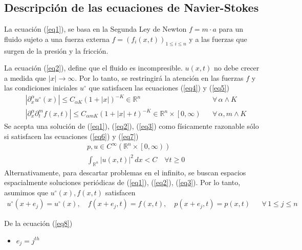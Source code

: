 \subsection{Descripción de las ecuaciones de Navier-Stokes}
La ecuación (\ref{eq1}), se basa en la Segunda Ley de Newton $f=m\cdot a$ para un fluido sujeto a una fuerza externa $f= \left(f_i(x,t)\right)_{1\leq i\leq n}$ y a las fuerzas que surgen de la presión y la fricción.

La ecuación (\ref{eq2}), define que el fluido es incompresible.  $u(x, t)$ no debe crecer a medida que $\left\lvert x\right\rvert \to \infty$. Por lo tanto, se restringirá la atención en las fuerzas $f$ y las condiciones iniciales $u^{\circ}$ que satisfacen las ecuaciones (\ref{eq4}) y (\ref{eq5})
\begin{align}
    &\left\lvert \partial_x^{\alpha}u^{\circ}(x) \right\rvert\leq C_{\alpha K}\left(1 + \left\lvert x \right\rvert  \right)^{-K}\in \mathbb{R}^n&& \forall\, \alpha\land K\label{eq4}\\
    &\left\lvert \partial_x^{\alpha}\partial_t^{m} f(x,t) \right\rvert\leq C_{\alpha m K}\left(1 + \left\lvert x \right\rvert + t \right)^{-K}\in \mathbb{R}^n\times \left[ 0,\infty \right)&& \forall\, \alpha, m \land K \label{eq5}
\end{align}
Se acepta una solución de (\ref{eq1}), (\ref{eq2}), (\ref{eq3}) como físicamente razonable sólo si satisfacen las ecuaciones (\ref{eq6}) y (\ref{eq7})
\begin{align}
    &p,u\in C^{\infty}\left( \mathbb{R}^n \times \left[ 0, \infty\right) \right)\label{eq6}\\
    & \int_{\mathbb{R}^n} \left\lvert u(x,t)\right\rvert^2\, dx < C\quad \forall t\geq 0\label{eq7}  
\end{align}
Alternativamente, para descartar problemas en el infinito, se buscan espacios espacialmente soluciones periódicas de (\ref{eq1}), (\ref{eq2}), (\ref{eq3}). Por lo tanto, asumimos que $u^{\circ}(x), f(x,t)$ satisfacen
\begin{align}
    u^{\circ}(x + e_j) = u^{\circ}(x),\quad f(x + e_j,t) = f(x,t),\quad p(x + e_j,t) = p(x,t) && \forall\, 1\leq j\leq n\label{eq8}
\end{align}
\begin{notation} De la ecuación (\ref{eq8})
    \begin{itemize}
        \item $e_j = j^{th}$
    \end{itemize}
\end{notation}
